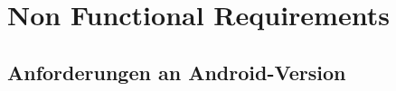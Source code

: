 
\section{Non Functional Requirements}
\label{sec:Non Functional Requirements}

\subsection{Anforderungen an Android-Version}
\label{subsec:Non Functional Requirements}
